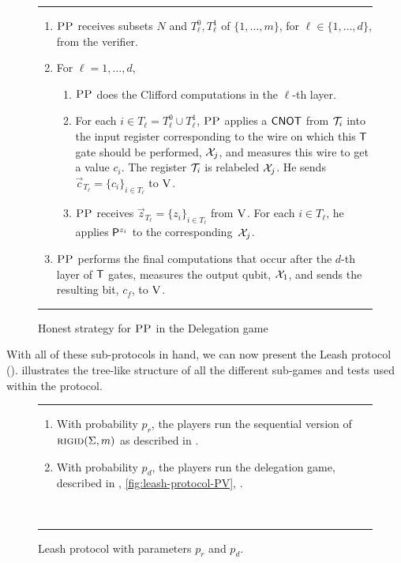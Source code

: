 \documentclass{toc}
\newcommand{\rigid}{\textsc{rigid}}
\newcommand{\ver}{\textsc{V}}
\newcommand{\pp}{\textsc{PP}}
\begin{document}
  \begin{figure}[htbp]
\rule[1ex]{\textwidth}{0.5pt}
\vspace{-1.8em}
\begin{enumerate}
\item $\pp$ receives subsets $N$ and $T_\ell^0,T_\ell^1$ of $\{1,\ldots,m\}$, for $\ell\in\{1,\ldots,d\}$, from the verifier. 
\item For $\ell=1,\dots,d$, 
\begin{enumerate}
\item $\pp$ does the Clifford computations in the $\ell$-th layer.
 \item For each $i\in T_\ell = T_\ell^0\cup T_\ell^1$, $\pp$ applies a $\sf CNOT$ from ${\cal T}_i$ into the input register corresponding to the wire on which this $\sf T$ gate should be performed, ${\cal X}_{j}$, and measures this wire to get a value $c_i$. The register ${\cal T}_i$ is relabeled ${\cal X}_{j}$. He sends $\vec{c}_{T_\ell} = \{c_i\}_{i\in T_{\ell}}$ to $\ver$.
\item $\pp$ receives $\vec{z}_{T_{\ell}}=\{z_i\}_{i\in T_\ell}$ from $\ver$. For each $i\in T_\ell$, he applies ${\sf P}^{z_i}$ to the corresponding~${\cal X}_{j}$. 
\end{enumerate} 
\item $\pp$ performs the final computations that occur after the $d$-th layer of $\sf T$ gates, measures the output qubit, ${\cal X}_1$, and sends the resulting bit, $c_f$, to $\ver$. 
\end{enumerate}
\rule[2ex]{\textwidth}{0.5pt}\vspace{-.5cm}
\caption{Honest strategy for $\pp$  in the Delegation game}\label{fig:leash-protocol-PP}
\end{figure}




With all of these sub-protocols in hand, we can now present the Leash protocol ().  illustrates the tree-like structure of all the different sub-games and tests used within the protocol.

\begin{figure}[H]
\rule[1ex]{\textwidth}{0.5pt}
\vspace{-25pt}
\justify 
\begin{enumerate}
\item With probability $p_r$, the players run the sequential version of $\rigid(\Sigma,m)$ as described in .
\item With probability $p_d$, the players run the delegation game, described in , \ref{fig:leash-protocol-PV}, .
\end{enumerate}
~\\
\rule[2ex]{\textwidth}{0.5pt}\vspace{-.5cm}
\caption{Leash protocol with parameters $p_r$ and $p_d$.}
\label{fig:leash-description}
\end{figure} 
\end{document}

